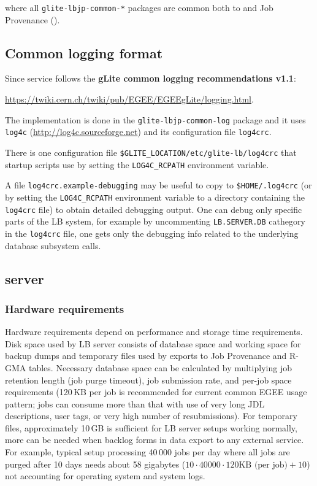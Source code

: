 where all \verb'glite-lbjp-common-*' packages are common both to \LB and 
Job Provenance (\JP).

\subsection{Common logging format}
Since  \LB service follows the \textbf{gLite common logging recommendations v1.1}:
\begin{center}
\url{https://twiki.cern.ch/twiki/pub/EGEE/EGEEgLite/logging.html}. 
\end{center}

The implementation is done in the \texttt{glite-lbjp-common-log} package and it 
uses \texttt{log4c} (\url{http://log4c.sourceforge.net})
and its configuration file \texttt{log4crc}. 

There is one configuration file \texttt{\$GLITE\_LOCATION/etc/glite-lb/log4crc}
that startup scripts use by setting the \texttt{LOG4C\_RCPATH} environment
variable.

A file \texttt{log4crc.example-debugging} may be useful to copy to
\texttt{\$HOME/.log4crc} (or by setting the \texttt{LOG4C\_RCPATH} environment variable
to a directory containing the \texttt{log4crc} file) to obtain detailed debugging output.
One can debug only specific parts of the LB system, for example
by uncommenting \texttt{LB.SERVER.DB} cathegory in the \texttt{log4crc} file,
one gets only the debugging info related to the underlying database subsystem calls.


\subsection{\LB server}

\subsubsection{Hardware requirements}
\label{inst:hw_req}

Hardware requirements depend on performance and storage time requirements.
Disk space used by LB server consists of database space and working space 
for backup dumps and temporary files used by exports to Job Provenance and
R-GMA tables. Necessary database space can be calculated by multiplying 
job retention length (job purge timeout), job submission rate, and  
per-job space requirements (120\,KB per job is recommended for current common 
EGEE usage pattern; jobs can consume more than that with use of very long
JDL descriptions, user tags, or very high number of resubmissions).
For temporary files, approximately 10\,GB is sufficient for LB server setups
working normally, more can be needed when backlog forms in data export
to any external service. For example, typical setup processing 40\,000 jobs per 
day where all jobs are purged after 10 days needs about 58 gigabytes
($10 \cdot 40000 \cdot 120 \mbox{KB (per job)} + 10$) not accounting for operating 
system and system logs.

